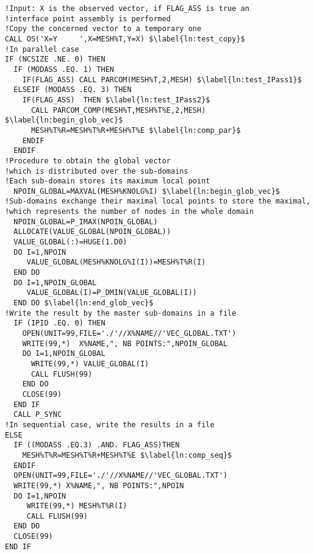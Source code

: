 \begin{lstlisting}[language=TelFortran, caption={The BIEF\_OBJ structure in \texttt{glob\_vec}},label={lst:GlobVec},escapechar=\$]
!Input: X is the observed vector, if FLAG_ASS is true an
!interface point assembly is performed
!Copy the concerned vector to a temporary one
CALL OS('X=Y     ',X=MESH%T,Y=X) $\label{ln:test_copy}$
!In parallel case
IF (NCSIZE .NE. 0) THEN 
  IF (MODASS .EQ. 1) THEN
    IF(FLAG_ASS) CALL PARCOM(MESH%T,2,MESH) $\label{ln:test_IPass1}$
  ELSEIF (MODASS .EQ. 3) THEN
    IF(FLAG_ASS)  THEN $\label{ln:test_IPass2}$
      CALL PARCOM_COMP(MESH%T,MESH%T%E,2,MESH)   $\label{ln:begin_glob_vec}$
      MESH%T%R=MESH%T%R+MESH%T%E $\label{ln:comp_par}$
    ENDIF
  ENDIF
!Procedure to obtain the global vector 
!which is distributed over the sub-domains
!Each sub-domain stores its maximum local point
  NPOIN_GLOBAL=MAXVAL(MESH%KNOLG%I) $\label{ln:begin_glob_vec}$
!Sub-domains exchange their maximal local points to store the maximal, 
!which represents the number of nodes in the whole domain
  NPOIN_GLOBAL=P_IMAX(NPOIN_GLOBAL) 
  ALLOCATE(VALUE_GLOBAL(NPOIN_GLOBAL))
  VALUE_GLOBAL(:)=HUGE(1.D0)
  DO I=1,NPOIN
     VALUE_GLOBAL(MESH%KNOLG%I(I))=MESH%T%R(I)
  END DO
  DO I=1,NPOIN_GLOBAL
     VALUE_GLOBAL(I)=P_DMIN(VALUE_GLOBAL(I))
  END DO $\label{ln:end_glob_vec}$
!Write the result by the master sub-domains in a file
  IF (IPID .EQ. 0) THEN 
    OPEN(UNIT=99,FILE='./'//X%NAME//'VEC_GLOBAL.TXT')
    WRITE(99,*)  X%NAME,", NB POINTS:",NPOIN_GLOBAL
    DO I=1,NPOIN_GLOBAL
      WRITE(99,*) VALUE_GLOBAL(I)
      CALL FLUSH(99)
    END DO
    CLOSE(99)
  END IF
  CALL P_SYNC
!In sequential case, write the results in a file
ELSE
  IF ((MODASS .EQ.3) .AND. FLAG_ASS)THEN
    MESH%T%R=MESH%T%R+MESH%T%E $\label{ln:comp_seq}$
  ENDIF
  OPEN(UNIT=99,FILE='./'//X%NAME//'VEC_GLOBAL.TXT')
  WRITE(99,*) X%NAME,", NB POINTS:",NPOIN
  DO I=1,NPOIN
     WRITE(99,*) MESH%T%R(I)
     CALL FLUSH(99)
  END DO
  CLOSE(99)
END IF
\end{lstlisting}
%

